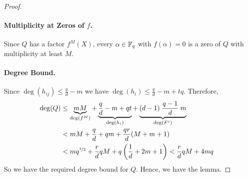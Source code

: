 \begin{proof}
  \paragraph*{Multiplicity at Zeros of $f$.} Since $Q$ has a factor $f^M(X)$, every $\alpha\in\mathbb{F}_q$ with $f(\alpha)=0$ is a zero of $Q$ with multiplicity at least $M$.
  \paragraph*{Degree Bound.} Since $\deg(h_{ij})\leq \frac{q}{d}-m$ we have $\deg(h_i)\leq \frac{q}{d}-m+tq$. Therefore,
  \begin{align*}
    \deg(Q) & \leq \underbrace{m M}_{\deg(f^M)}+\underbrace{\frac{q}{d}-m+qt}_{\deg(h_i)}+\underbrace{(d-1)\;\frac{q-1}{d}\;m}_{\deg(F^i)}\\ 
    & <mM+\frac{q}{d}+qm+\frac{qr}{d}(M+m+1)\\ 
    & <mq^{\nicefrac12}+\frac{r}{d}qM+q\left(\frac1d+2m+1\right)<\frac{r}{d}qM+4mq
  \end{align*}
  So we have the required degree bound for $Q$. Hence, we have the lemma.
\end{proof}

